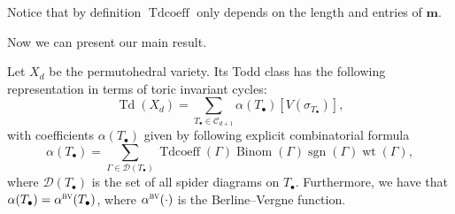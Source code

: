 \documentclass[ALCO,ThmDefs,Unicode,epreuves]{cedram}
\newcommand{\bm}[1]{{\boldsymbol{#1}}}
\newcommand\m{\bm{m}}
\DeclareMathOperator{\wt}{wt}
\DeclareMathOperator{\Bi}{Binom}
\DeclareMathOperator{\sgn}{sgn}
\DeclareMathOperator{\Tdcoeff}{Tdcoeff}
\DeclareMathOperator{\td}{Td}
\newcommand{\D}{{\Gamma}}
\newcommand{\CC}{\mathcal{C}}
\newcommand{\bv}{\alpha^{\textsc{bv}}}
\begin{document}
\begin{rema}\label{rem:Tsymm}
	Notice that by definition $\Tdcoeff$ only depends on the length and entries of $\m$.
\end{rema}


Now we can present our main result.
\begin{thm}\label{thm:main}
	Let $X_d$ be the permutohedral variety. Its Todd class has the following representation in terms of toric invariant cycles:
	\begin{equation}\label{eq:mainexpansion}
	\td(X_d)= \sum_{T_{\bullet}\in\CC_{d+1}} \alpha(T_{\bullet}) [V(\sigma_{T_{\bullet}})],
	\end{equation}
	with coefficients $\alpha(T_\bullet)$ given by following explicit combinatorial formula
	\begin{equation}\label{eq:masterformula}
	\alpha(T_{\bullet}) = \sum_{\D\in\mathcal{D}(T_\bullet)} \Tdcoeff(\D)\Bi(\D)\sgn(\D)\wt(\D),
	\end{equation}
	where $\mathcal{D}(T_\bullet)$ is the set of all spider diagrams on $T_\bullet$. Furthermore, we have that $\alpha(T_\bullet)=\bv(T_\bullet)$, where $\bv(\cdot)$ is the Berline--Vergne function.
\end{thm}
\end{document}
